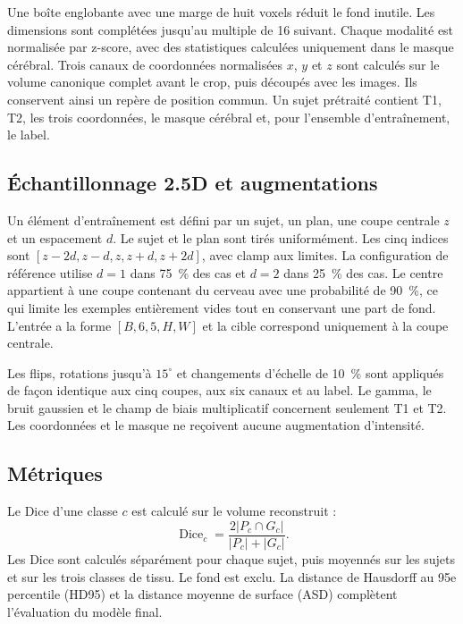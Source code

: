 \documentclass[11pt,a4paper]{article}
\begin{document}
Une boîte englobante avec une marge de huit voxels réduit le fond inutile. Les
dimensions sont complétées jusqu'au multiple de 16 suivant. Chaque modalité est
normalisée par z-score, avec des statistiques calculées uniquement dans le
masque cérébral. Trois canaux de coordonnées normalisées $x$, $y$ et $z$
sont calculés sur le volume canonique complet avant le crop, puis découpés avec
les images. Ils conservent ainsi un repère de position commun. Un sujet
prétraité contient T1, T2, les trois coordonnées, le masque cérébral et, pour
l'ensemble d'entraînement, le label.

\subsection{Échantillonnage 2.5D et augmentations}

Un élément d'entraînement est défini par un sujet, un plan, une coupe centrale
$z$ et un espacement $d$. Le sujet et le plan sont tirés uniformément. Les cinq
indices sont $[z-2d,z-d,z,z+d,z+2d]$, avec clamp aux limites. La configuration
de référence utilise $d=1$ dans 75~\% des cas et $d=2$ dans 25~\% des cas. Le
centre appartient à une coupe contenant du cerveau avec une probabilité de
90~\%, ce qui limite les exemples entièrement vides tout en conservant une part
de fond. L'entrée a la forme $[B,6,5,H,W]$ et la cible correspond uniquement à
la coupe centrale.

Les flips, rotations jusqu'à $15^\circ$ et changements d'échelle de 10~\% sont
appliqués de façon identique aux cinq coupes, aux six canaux et au label. Le
gamma, le bruit gaussien et le champ de biais multiplicatif concernent seulement
T1 et T2. Les coordonnées et le masque ne reçoivent aucune augmentation
d'intensité.

\subsection{Métriques}

Le Dice d'une classe $c$ est calculé sur le volume reconstruit :
\begin{equation}
  \operatorname{Dice}_c =
  \frac{2\lvert P_c \cap G_c\rvert}
       {\lvert P_c\rvert + \lvert G_c\rvert}.
\end{equation}
Les Dice sont calculés séparément pour chaque sujet, puis moyennés sur les
sujets et sur les trois classes de tissu. Le fond est exclu. La distance de
Hausdorff au 95e percentile (HD95) et la distance moyenne de surface (ASD)
complètent l'évaluation du modèle final.
\end{document}

